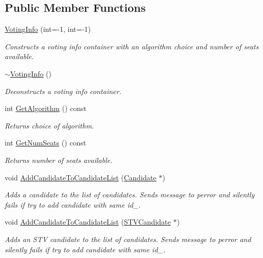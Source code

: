 \subsection*{Public Member Functions}
\begin{DoxyCompactItemize}
\item 
\hyperlink{classVotingInfo_a7bdb2f2026f5f68eee3fbee92855b759}{Voting\+Info} (int=-\/1, int=-\/1)
\begin{DoxyCompactList}\small\item\em Constructs a voting info container with an algorithm choice and number of seats available. \end{DoxyCompactList}\item 
\mbox{\label{classVotingInfo_a72e88f41ab4e266582041b8f42768586}} 
\hyperlink{classVotingInfo_a72e88f41ab4e266582041b8f42768586}{$\sim$\+Voting\+Info} ()
\begin{DoxyCompactList}\small\item\em Deconstructs a voting info container. \end{DoxyCompactList}\item 
int \hyperlink{classVotingInfo_a2d0abd1d9be36bfd9fb734dfa644b8e1}{Get\+Algorithm} () const
\begin{DoxyCompactList}\small\item\em Returns choice of algorithm. \end{DoxyCompactList}\item 
int \hyperlink{classVotingInfo_a9c226e3b169e0228ab26cb0a251792bd}{Get\+Num\+Seats} () const
\begin{DoxyCompactList}\small\item\em Returns number of seats available. \end{DoxyCompactList}\item 
void \hyperlink{classVotingInfo_ac0ab5f83a06ea6721999addb43a581ea}{Add\+Candidate\+To\+Candidate\+List} (\hyperlink{classCandidate}{Candidate} $\ast$)
\begin{DoxyCompactList}\small\item\em Adds a candidate to the list of candidates. Sends message to perror and silently fails if try to add candidate with same id\+\_\+. \end{DoxyCompactList}\item 
void \hyperlink{classVotingInfo_a18d8dfef16797ef988a296d5ef28c852}{Add\+Candidate\+To\+Candidate\+List} (\hyperlink{classSTVCandidate}{S\+T\+V\+Candidate} $\ast$)
\begin{DoxyCompactList}\small\item\em Adds an S\+TV candidate to the list of candidates. Sends message to perror and silently fails if try to add candidate with same id\+\_\+. \end{DoxyCompactList}\item 

\end{DoxyCompactItemize}
